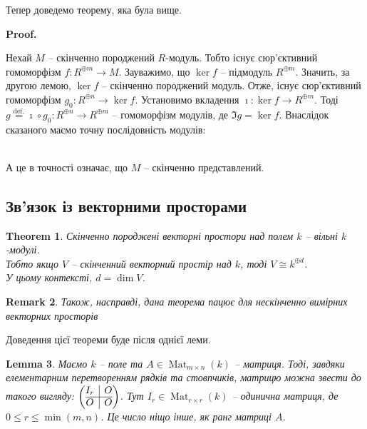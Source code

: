 \documentclass[a4paper, 10pt]{article}
\makeatletter
\theoremstyle{theoremdd}
\newtheorem{theorem}{Theorem}[subsection]
\theoremstyle{theoremdd}
\theoremstyle{theoremdd}
\theoremstyle{theoremdd}
\theoremstyle{theoremdd}
\theoremstyle{theoremdd}
\theoremstyle{theoremdd}
\theoremstyle{theoremdd}
\theoremstyle{theoremdd}
\theoremstyle{theoremdd}
\theoremstyle{theoremdd}
\newtheorem{remark}[theorem]{Remark}
\theoremstyle{theoremdd}
\theoremstyle{theoremdd}
\newtheorem{lemma}[theorem]{Lemma}
\theoremstyle{theoremdd}
\theoremstyle{theoremdd}
\renewenvironment{proof}[1][Proof.\\]{\par
\pushQED{\hfill \qed}%
\normalfont \topsep6\p@\@plus6\p@\relax
\trivlist
\item\relax
{\bfseries
#1\@addpunct{.}}\hspace\labelsep\ignorespaces
}{%
\popQED\endtrivlist\@endpefalse
}
\DeclareMathOperator{\Mat}{Mat}
\makeatother
\begin{document}
Тепер доведемо теорему, яка була вище.
\begin{proof}
Нехай $M$ -- скінченно породжений $R$-модуль. Тобто існує сюр'єктивний гомоморфізм $f \colon R^{\oplus m} \to M$. Зауважимо, що $\ker f$ -- підмодуль $R^{\oplus m}$. Значить, за другою лемою, $\ker f$ -- скінченно породжений модуль. Отже, існує сюр'єктивний гомоморфізм $g_0 \colon R^{\oplus n} \to \ker f$. Установимо вкладення $\imath \colon \ker f \to R^{\oplus m}$. Тоді $g \overset{\text{def.}}{=} \imath \circ g_0 \colon R^{\oplus n} \to R^{\oplus m}$ -- гомоморфізм модулів, де $\Im g = \ker f$. Внаслідок сказаного маємо точну послідовність модулів:\\
\\
А це в точності означає, що $M$ -- скінченно представлений.
\end{proof}

\subsection{Зв'язок із векторними просторами}
\begin{theorem}
Скінченно породжені векторні простори над полем $k$ -- вільні $k$-модулі.\\
Тобто якщо $V$ -- скінченний векторний простір над $k$, тоді $V \cong k^{\oplus d}$.\\
У цьому контексті, $d = \dim V$.
\end{theorem}

\begin{remark}
Також, насправді, дана теорема пацює для нескінченно вимірних векторних просторів
\end{remark}

Доведення цієї теореми буде після однієї леми.

\begin{lemma}
Маємо $k$ -- поле та $A \in \Mat_{m \times n}(k)$ -- матриця. Тоді, завдяки елементарним перетворенням рядків та стовпчиків, матрицю можна звести до такого вигляду:
$\left(\begin{array}{@{}c|c@{}}
I_r & O \\
\hline
O & O
\end{array} \right)$. Тут $I_r \in \Mat_{r \times r}(k)$ -- одинична матриця, де $0 \leq r \leq \min(m,n)$. Це число ніщо інше, як ранг матриці $A$.
\end{lemma}
\end{document}
